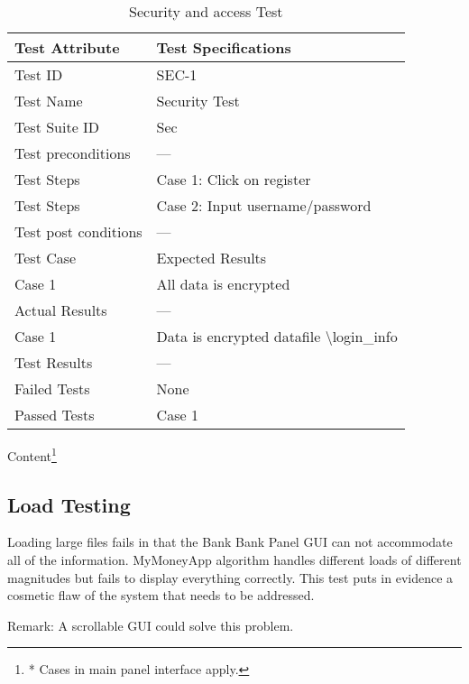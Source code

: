 \documentclass{article}
\begin{document}
\begin{table}[htbp]
\begin{center}
\begin{tabular}{|l | l|}
\hline
Test Attribute & Test Specifications \\
\hline
Test ID & SEC-1 \\
\hline
Test Name  & Security Test \\
\hline
Test Suite  ID& Sec \\
\hline
 Test preconditions & --- \\
\hline
Test Steps & Case 1: Click on register \\
\hline
Test Steps & Case 2: Input username/password \\
\hline
Test post conditions & --- \\
\hline
Test Case & Expected Results\\
\hline
Case 1 & All data is encrypted  \\
\hline
Actual Results & ---\\
\hline
Case 1 & Data is encrypted  datafile \textbackslash login\_info \\
\hline
Test Results & ---\\
\hline
Failed Tests & None\\
\hline
Passed Tests & Case 1 \\
\hline
\end{tabular}
\end{center}

\caption{Security and access Test}
Content\footnote{* Cases in main panel interface apply.}
\end{table}
\label{table:}

\newpage





\subsection{Load Testing}

Loading large files fails in that the Bank Bank Panel GUI can not accommodate all of the information. 
\newline MyMoneyApp algorithm handles different loads of different magnitudes but fails to display everything correctly. This test puts in evidence a cosmetic flaw of the system that needs to be addressed.

Remark: A scrollable GUI could solve this problem.
\end{document}
